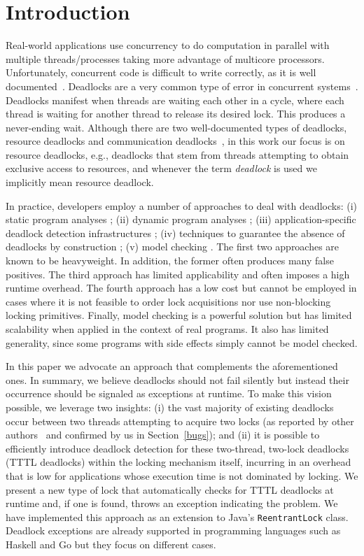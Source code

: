 \section{Introduction}

Real-world applications use concurrency to do computation in parallel with multiple threads/processes taking more advantage of multicore processors. Unfortunately, concurrent code is difficult to write correctly, as it is well documented~\cite{lu}. Deadlocks are a very common type of error in concurrent systems~\cite{lu}.
Deadlocks manifest when threads are waiting each other in a cycle, where each thread is waiting for another thread to release its desired lock. This produces a never-ending wait.
Although there are two well-documented types of deadlocks, resource deadlocks and communication deadlocks~\cite{singhal}\cite{knapp}, in this work our focus is on resource deadlocks, e.g., deadlocks that stem from threads attempting to obtain exclusive access to resources, and whenever the term \emph{deadlock} is used we implicitly mean resource deadlock.

In practice, developers employ a number of approaches to deal with deadlocks: (i) static program analyses \cite{marino}\cite{dawson}\cite{vivek}\cite{williams}; (ii) dynamic program analyses \cite{mcsdk}\cite{magicfuzzer}\cite{sammati}\cite{rx}; (iii) application-specific deadlock detection infrastructures \cite{orderedlock}; (iv) techniques to guarantee the absence of deadlocks by construction \cite{marino}; (v) model checking \cite{havelund}. The first two approaches are known to be heavyweight. In addition, the former often produces many false positives. The third approach has limited applicability and often imposes a high runtime overhead. The fourth approach has a low cost but cannot be employed in cases where it is not feasible to order lock acquisitions nor use non-blocking locking primitives. Finally, model checking is a powerful solution but has limited scalability when applied in the context of real programs. It also has limited generality, since some programs with side effects simply cannot be model checked.  

In this paper we advocate an approach that complements the aforementioned ones. In summary, we believe deadlocks should not fail silently but instead their occurrence  should be signaled as exceptions at runtime. To make this vision possible, we leverage two insights: (i) the vast majority of existing deadlocks occur between two threads attempting to acquire two locks (as reported by other authors~\cite{lu} and confirmed by us in Section~\ref{bugs}); and (ii) it is possible to efficiently introduce deadlock detection for these two-thread, two-lock deadlocks (TTTL deadlocks) within the locking mechanism itself, incurring in an overhead that is low for applications whose execution time is not dominated by locking. We present a new type of lock that automatically checks for TTTL deadlocks at runtime and, if one is found, throws an exception indicating the problem. We have implemented this approach as an extension to Java's {\tt ReentrantLock} class. Deadlock exceptions are already supported in programming languages such as Haskell\cite{marlow} and Go\cite{golang} but they focus on different cases.

